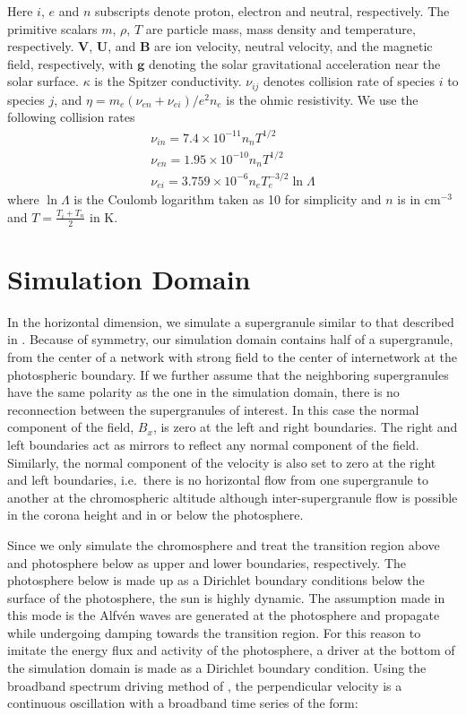 \documentclass[12pt,upcase]{umlthesis}
\begin{document}
Here $i$, $e$ and $n$ subscripts denote proton, electron and neutral, respectively. The primitive scalars $m$, $\rho$, $T$ are particle mass, mass density and temperature, respectively. $\textbf{V}$, $\textbf{U}$, and $\textbf{B}$ are ion velocity, neutral velocity, and the magnetic field, respectively, with $\textbf{g}$ denoting the solar gravitational acceleration near the solar surface. $\kappa$ is the Spitzer conductivity. $\nu_{ij}$ denotes collision rate of species $i$ to species $j$, and $\eta = m_e(\nu_{en} + \nu_{ei})/e^2n_e$ is the ohmic resistivity. We use the following collision rates \citep[see][Appendix A]{Pontieu2001} 
\begin{eqnarray}
&\nu_{in} = 7.4 \times 10^{-11} n_n T^{1/2}& \nonumber\\
&\nu_{en} = 1.95 \times 10^{-10} n_n T^{1/2}& \\
&\nu_{ei} = 3.759 \times 10^{-6} n_e T_e^{-3/2} \ln \Lambda& \nonumber
\end{eqnarray}
where $\ln \Lambda$ is the Coulomb logarithm taken as 10 for simplicity and $n$ is in cm$^{-3}$ and $T = \frac{T_i + T_n}{2}$ in K.

\section{Simulation Domain}\label{sec:simulationdomain}

In the horizontal dimension, we simulate a supergranule similar to that described in \citet{Song2017}. Because of symmetry, our simulation domain contains half of a supergranule, from the center of a network with strong field to the center of internetwork at the photospheric boundary. If we further assume that the neighboring supergranules have the same polarity as the one in the simulation domain, there is no reconnection between the supergranules of interest.  In this case  the normal component of the field, $B_x$, is zero at the left and right boundaries. The right and left boundaries act as mirrors to reflect any normal component of the field. Similarly, the normal component of the velocity is also set to zero at the right and left boundaries, i.e.\ there is no horizontal flow from one supergranule to another at the chromospheric altitude although inter-supergranule flow is possible in the corona height and in or below the photosphere. 

Since we only simulate the chromosphere and treat the transition region above and photosphere below as upper and lower boundaries, respectively. The photosphere below is made up as a Dirichlet boundary conditions below the surface of the photosphere, the sun is highly dynamic. The assumption made in this mode is the Alfv\'en waves are generated at the photosphere and propagate while undergoing damping towards the transition region. For this reason to imitate the energy flux and activity of the photosphere, a driver at the bottom of the simulation domain is made as a Dirichlet boundary condition. Using the broadband spectrum driving method of \citet{Tu2013}, the perpendicular velocity is a continuous oscillation with a broadband time series of the form:
\end{document}
